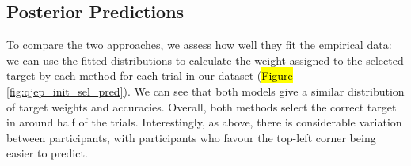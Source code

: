 \documentclass[vision,article,accept,pdftex,moreauthors]{Definitions/mdpi}
\begin{document}
\subsection{Posterior Predictions}

To compare the two approaches, we assess how well they fit the empirical data: we can use the fitted distributions to calculate the weight assigned to the selected target by each method for each trial in our dataset (\hl{Figure} \ref{fig:qjep_init_sel_pred}). We can see that both models give a similar distribution of target weights and accuracies. Overall, both methods  select the correct target in around half of the trials. Interestingly, as above, there is considerable variation between participants, with participants who favour the top-left corner being easier to predict. %
\end{document}
